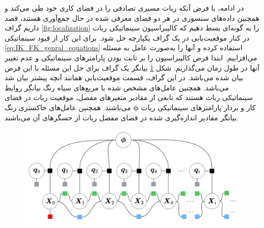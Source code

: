 در ادامه، با فرض آنکه ربات مسیری تصادفی را در فضای کاری خود طی می‌کند و همچنین داده‌های سنسوری در هر دو فضای معرفی شده در حال جمع‌آوری هستند، قصد داریم گراف
\ref{fig:localization}
را به گونه‌ای بسط دهیم که کالیبراسیون سینماتیکی ربات در کنار موقعیت‌یابی در یک گراف یکپارچه حل شود. برای این کار از قیود سینماتیکی
\ref{eq:IK_FK_genral_equations}
استفاده کرده و آنها را به‌صورت عامل به مسئله می‌افزاییم. ابتدا فرض کالیبراسیون را بر ثابت بودن پارامترهای سینماتیکی و عدم تغییر آنها در طول زمان می‌گذاریم. شکل
\ref{fig:kinematiclocalizationbasic}
بیانگر یک گراف برای حل این مسئله با این فرض بیان شده می‌باشد. در این گراف، قسمت موقعیت‌یابی همانند آنچه پیشتر بیان شد می‌باشد. همچنین عامل‌های مشخص شده با مربع‌های سیاه رنگ بیانگر روابط سینماتیکی ربات هستند که تابعی از مقادیر متغیرهای مفصل، موقعیت ربات در فضای کار و بردار پارامترهای سینماتیکی ربات
 $\boldsymbol{\phi}$
 می‌باشند. همچنین عامل‌های خاکستری رنگ بیانگر مقادیر اندازه‌گیری شده در فضای مفصل ربات از حسگرهای آن می‌باشند. 
\begin{figure}
	\centering
	\includegraphics[width=0.7\linewidth]{img/Kinematic_localization_basic}
	\caption{}
	\label{fig:kinematiclocalizationbasic}
\end{figure}

